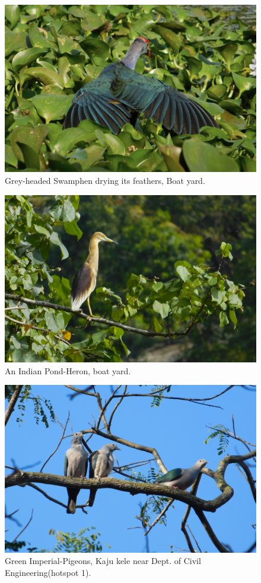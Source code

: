 \begin{figure}[!htpb]
    \centering
    \includegraphics[width=\linewidth]{Figures/swamp-hen.JPG}
    \caption[]{Grey-headed Swamphen drying its feathers, Boat yard.}
    \label{fig:figure-01}
\end{figure}
\begin{figure}[!htpb]
    \centering
    \includegraphics[width=\linewidth]{Figures/pond-heron.JPG}
    \caption[]{An Indian Pond-Heron, boat yard. }
    \label{fig:figure-01}
\end{figure}
\begin{figure}[!htpb]
    \centering
    \includegraphics[width=\linewidth]{Figures/imperial-pigeon.JPG}
    \caption[]{Green Imperial-Pigeons, Kaju kele near Dept. of Civil Engineering(hotspot 1).}
    \label{fig:figure-01}
\end{figure}
